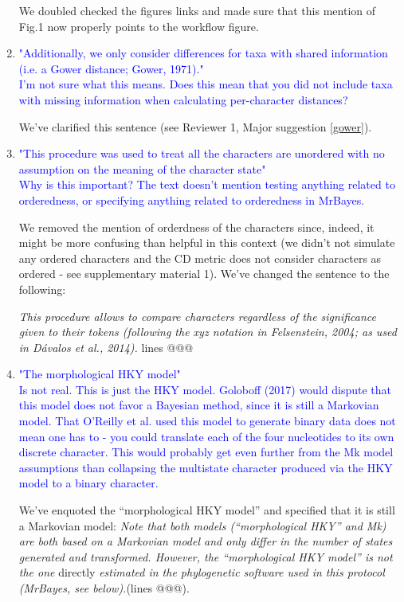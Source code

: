 \documentclass[12pt,letterpaper]{article}
\begin{document}
\begin{enumerate}
We doubled checked the figures links and made sure that this mention of Fig.1 now properly points to the workflow figure.

\item{\textcolor{blue}{"Additionally, we only consider differences for taxa with shared information (i.e. a Gower distance; Gower, 1971)."\\
I'm not sure what this means. Does this mean that you did not include taxa with missing information when calculating per-character distances?}}

We've clarified this sentence (see Reviewer 1, Major suggestion \ref{gower}).

\item{\textcolor{blue}{"This procedure was used to treat all the characters are unordered with no assumption on the meaning of the character state"\\
Why is this important? The text doesn't mention testing anything related to orderedness, or specifying anything related to orderedness in MrBayes.}}

We removed the mention of orderdness of the characters since, indeed, it might be more confusing than helpful in this context (we didn't not simulate any ordered characters and the CD metric does not consider characters as ordered - see supplementary material 1). We've changed the sentence to the following:

\textit{This procedure allows to compare characters regardless of the significance given to their tokens (following the \textit{xyz} notation in Felsenstein, 2004; as used in D\'{a}valos et al., 2014).} lines @@@

\item{\textcolor{blue}{"The morphological HKY model"\\
Is not real. This is just the HKY model. Goloboff (2017) would dispute that this model does not favor a Bayesian method, since it is still a Markovian model. That O'Reilly et al. used this model to generate binary data does not mean one has to - you could translate each of the four nucleotides to its own discrete character. This would probably get even further from the Mk model assumptions than collapsing the multistate character produced via the HKY model to a binary character.}}

We've enquoted the ``morphological HKY model'' and specified that it is still a Markovian model:
\textit{Note that both models (``morphological HKY'' and Mk) are both based on a Markovian model and only differ in the number of states generated and transformed.
However, the ``morphological HKY model'' is not the one} directly \textit{estimated in the phylogenetic software used in this protocol (MrBayes, see below).}(lines @@@).


\end{enumerate}
\end{document}

